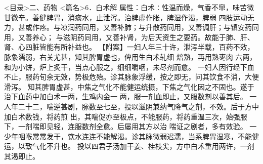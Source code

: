 \documentclass[a4paper,12pt,UTF8,twoside]{ctexbook}
\begin{document}
<目录>二、药物
<篇名>6．白术解
属性：白术∶性温而燥，气香不窜，味苦微甘微辛。善健脾胃，消痰水，止泄泻。治脾虚作胀，脾湿作渴，脾弱 
四肢运动无力，甚或作疼。与凉润药同用，又善补肺；与升散药同用，又善调肝；与镇安药同用，又善养心； 
与滋阴药同用，又善补肾，为后天资生之要药。故能于肺、肝、肾、心四脏皆能有所补益也。 
【附案】一妇人年三十许，泄泻半载，百药不效，脉象濡弱，右关尤甚，知其脾胃虚也，俾用生白术轧细 
焙熟，再用熟枣肉 
六两，和为小饼，炉上炙干，当点心服之，细细嚼咽，未尽剂而愈。 
一妇人因行经下血不止，服药旬余无效，势极危殆。诊其脉象浮缓，按之即无，问其饮食不消，大便滑泻。 
知其脾胃虚甚，中焦之气化不能健运统摄，下焦之气化因之不固也。遂于治下血药中加白术一两，生鸡内金一 
两，服一剂血即止，又服数剂以善其后。 
一人年二十二，喘逆甚剧，脉数至七至，投以滋阴兼纳气降气之剂，不效。后于方中加白术数钱，将药煎 
出，其喘促亦至极点，不能服药，将药重温三次，始强服下，一剂喘即见轻，连服数剂全愈。后屡用其方以治 
喘证之剧者，多有效验。 
一少年咽喉常常发干，饮水连连不能解渴。诊其脉微弱迟濡，当系脾胃湿寒，不能健运，以致气化不升也。 
投以四君子汤加干姜、桂枝尖，方中白术重用两许，一剂其渴即止。 
\end{document}
